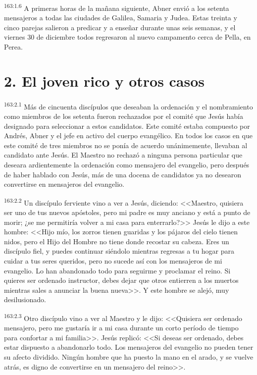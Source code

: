 \par 
\textsuperscript{163:1.6} A primeras horas de la mañana siguiente, Abner envió a los setenta mensajeros a todas las ciudades de Galilea, Samaria y Judea. Estas treinta y cinco parejas salieron a predicar y a enseñar durante unas seis semanas, y el viernes 30 de diciembre todos regresaron al nuevo campamento cerca de Pella, en Perea.

\section*{2. El joven rico y otros casos}
\par 
\textsuperscript{163:2.1} Más de cincuenta discípulos que deseaban la ordenación y el nombramiento como miembros de los setenta fueron rechazados por el comité que Jesús había designado para seleccionar a estos candidatos. Este comité estaba compuesto por Andrés, Abner y el jefe en activo del cuerpo evangélico. En todos los casos en que este comité de tres miembros no se ponía de acuerdo unánimemente, llevaban al candidato ante Jesús. El Maestro no rechazó a ninguna persona particular que deseara ardientemente la ordenación como mensajero del evangelio, pero después de haber hablado con Jesús, más de una docena de candidatos ya no desearon convertirse en mensajeros del evangelio.

\par 
\textsuperscript{163:2.2} Un discípulo ferviente vino a ver a Jesús, diciendo: <<Maestro, quisiera ser uno de tus nuevos apóstoles, pero mi padre es muy anciano y está a punto de morir; ¿se me permitiría volver a mi casa para enterrarlo?>> Jesús le dijo a este hombre: <<Hijo mío, los zorros tienen guaridas y los pájaros del cielo tienen nidos, pero el Hijo del Hombre no tiene donde recostar su cabeza. Eres un discípulo fiel, y puedes continuar siéndolo mientras regresas a tu hogar para cuidar a tus seres queridos, pero no sucede así con los mensajeros de mi evangelio. Lo han abandonado todo para seguirme y proclamar el reino. Si quieres ser ordenado instructor, debes dejar que otros entierren a los muertos mientras sales a anunciar la buena nueva>>. Y este hombre se alejó, muy desilusionado.

\par 
\textsuperscript{163:2.3} Otro discípulo vino a ver al Maestro y le dijo: <<Quisiera ser ordenado mensajero, pero me gustaría ir a mi casa durante un corto período de tiempo para confortar a mi familia>>. Jesús replicó: <<Si deseas ser ordenado, debes estar dispuesto a abandonarlo todo. Los mensajeros del evangelio no pueden tener su afecto dividido. Ningún hombre que ha puesto la mano en el arado, y se vuelve atrás, es digno de convertirse en un mensajero del reino>>.

